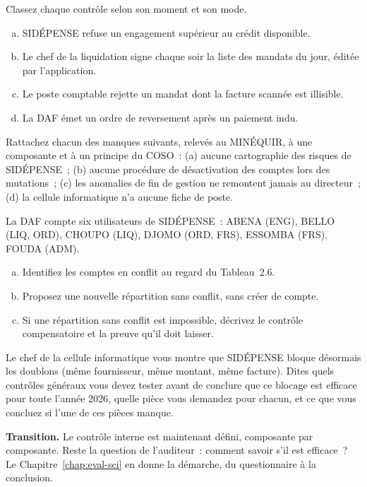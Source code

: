 \begin{boxexo}[title={\ding{45}\quad Exercice~2.1. Classer des contrôles \niveaubase}]
Classez chaque contrôle selon son moment et son mode.
\begin{enumerate}[(a)]
    \item SIDÉPENSE refuse un engagement supérieur au crédit disponible.
    \item Le chef de la liquidation signe chaque soir la liste des mandats
          du jour, éditée par l'application.
    \item Le poste comptable rejette un mandat dont la facture scannée est
          illisible.
    \item La DAF émet un ordre de reversement après un paiement indu.
\end{enumerate}
\end{boxexo}

\begin{boxexo}[title={\ding{45}\quad Exercice~2.2. Composantes et principes \niveaubase}]
Rattachez chacun des manques suivants, relevés au MINÉQUIR, à une
composante et à un principe du COSO~: (a) aucune cartographie des risques
de SIDÉPENSE~; (b) aucune procédure de désactivation des comptes lors des
mutations~; (c) les anomalies de fin de gestion ne remontent jamais au
directeur~; (d) la cellule informatique n'a aucune fiche de poste.
\end{boxexo}

\begin{boxexo}[title={\ding{45}\quad Exercice~2.3. Une matrice des profils \niveaumoyen}]
La DAF compte six utilisateurs de SIDÉPENSE~: ABENA (ENG), BELLO (LIQ,
ORD), CHOUPO (LIQ), DJOMO (ORD, FRS), ESSOMBA (FRS), FOUDA (ADM).
\begin{enumerate}[(a)]
    \item Identifiez les comptes en conflit au regard du Tableau~2.6.
    \item Proposez une nouvelle répartition sans conflit, sans créer de
          compte.
    \item Si une répartition sans conflit est impossible, décrivez le
          contrôle compensatoire et la preuve qu'il doit laisser.
\end{enumerate}
\end{boxexo}

\begin{boxexo}[title={\ding{45}\quad Exercice~2.4. Les contrôles généraux d'abord \niveauexpert}]
Le chef de la cellule informatique vous montre que SIDÉPENSE bloque
désormais les doublons (même fournisseur, même montant, même facture).
Dites quels contrôles généraux vous devez tester avant de conclure que ce
blocage est efficace pour toute l'année 2026, quelle pièce vous demandez
pour chacun, et ce que vous concluez si l'une de ces pièces manque.
\end{boxexo}

\begin{boxinfo}
\textbf{Transition.} Le contrôle interne est maintenant défini, composante
par composante. Reste la question de l'auditeur~: comment savoir s'il est
efficace~? Le Chapitre~\ref{chap:eval-sci} en donne la démarche, du
questionnaire à la conclusion.
\end{boxinfo}
